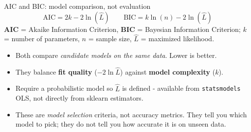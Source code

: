 \documentclass[aspectratio=169]{beamer}
\begin{document}
\begin{frame}{AIC and BIC: model comparison, not evaluation}
  \[
    \text{AIC} = 2k - 2 \ln(\hat{L})
    \qquad
    \text{BIC} = k \ln(n) - 2 \ln(\hat{L})
  \]
  \textbf{AIC} = Akaike Information Criterion, \textbf{BIC} = Bayesian Information Criterion; $k$ = number of parameters, $n$ = sample size, $\hat{L}$ = maximized likelihood.
  \vfill
  \begin{itemize}
    \item Both compare \emph{candidate models on the same data}. Lower is better.
    \item They balance \textbf{fit quality} ($-2 \ln \hat{L}$) against \textbf{model complexity} ($k$).
    \item Require a probabilistic model so $\hat{L}$ is defined - available from \texttt{statsmodels} OLS, not directly from sklearn estimators.
    \item These are \emph{model selection} criteria, not accuracy metrics. They tell you which model to pick; they do not tell you how accurate it is on unseen data.
  \end{itemize}
\end{frame}
\end{document}
